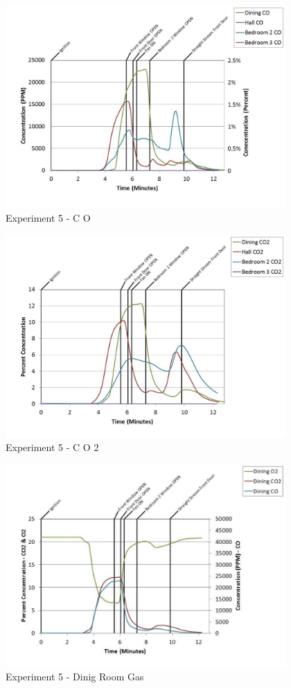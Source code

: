 \documentclass{article}
\begin{document}
\begin{appendices}
	\begin{figure}[h!]
		\centering
		\includegraphics[height=3.05in]{0_Images/Results_Charts/Exp_5_Charts/CO.pdf}
		\caption{Experiment 5 - C O}
	\end{figure}
 
	\clearpage

	\begin{figure}[h!]
		\centering
		\includegraphics[height=3.05in]{0_Images/Results_Charts/Exp_5_Charts/CO2.pdf}
		\caption{Experiment 5 - C O 2}
	\end{figure}
 

	\begin{figure}[h!]
		\centering
		\includegraphics[height=3.05in]{0_Images/Results_Charts/Exp_5_Charts/DinigRoomGas.pdf}
		\caption{Experiment 5 - Dinig Room Gas}
	\end{figure}
 

\end{appendices}
\end{document}
